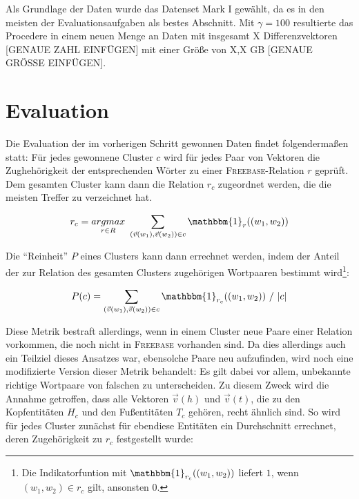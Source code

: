 Als Grundlage der Daten wurde das Datenset Mark I gewählt, da es in den meisten der Evaluationsaufgaben
als bestes Abschnitt. Mit $\gamma = 100$ resultierte das Procedere in einem neuen Menge an Daten mit insgesamt
X Differenzvektoren [GENAUE ZAHL EINFÜGEN] mit einer Größe von X,X GB [GENAUE GRÖSSE EINFÜGEN].\\

\section{Evaluation}

Die Evaluation der im vorherigen Schritt gewonnen Daten findet folgendermaßen statt: Für jedes gewonnene Cluster $c$ wird für
jedes Paar von Vektoren die Zughehörigkeit der entsprechenden Wörter zu einer \textsc{Freebase}-Relation $r$ geprüft.
Dem gesamten Cluster kann dann die Relation $r_c$ zugeordnet werden, die die meisten Treffer zu verzeichnet hat.

\begin{equation}
    r_c = \underset{r \in R}{argmax}\ \sum_{(\vec{v}(w_1), \vec{v}(w_2)) \in c}  \mathbbm{1}_{r}((w_1, w_2))
\end{equation}

Die ``Reinheit'' $P$ eines Clusters kann dann errechnet werden, indem der Anteil der zur Relation des gesamten Clusters
zugehörigen Wortpaaren bestimmt wird\footnote{Die Indikatorfuntion mit $\mathbbm{1}_{r_c}((w_1, w_2))$ liefert $1$, wenn
$(w_1, w_2) \in r_c$ gilt, ansonsten $0$.}:

\begin{equation}\label{form:purity}
    P(c) = \sum_{(\vec{v}(w_1), \vec{v}(w_2)) \in c} \mathbbm{1}_{r_c}((w_1, w_2))\ /\ |c|
\end{equation}

Diese Metrik bestraft allerdings, wenn in einem Cluster neue Paare einer Relation vorkommen, die noch nicht in \textsc{Freebase}
vorhanden sind. Da dies allerdings auch ein Teilziel dieses Ansatzes war, ebensolche Paare neu aufzufinden, wird noch
eine modifizierte Version dieser Metrik behandelt: Es gilt dabei vor allem, unbekannte richtige Wortpaare von falschen
zu unterscheiden. Zu diesem Zweck wird die Annahme getroffen, dass alle Vektoren $\vec{v}(h)$ und $\vec{v}(t)$, die zu den Kopfentitäten $H_c$ und
den Fußentitäten $T_c$ gehören, recht ähnlich sind. So wird für jedes Cluster zunächst für ebendiese Entitäten ein Durchschnitt
errechnet, deren Zugehörigkeit zu $r_c$ festgestellt wurde:

